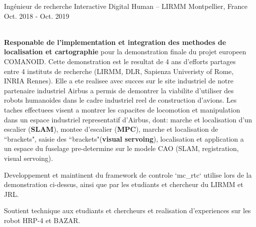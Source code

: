 \begin{cventries}
  \cventry
    {Ingénieur de recherche} %
    {Interactive Digital Human -- LIRMM} %
    {Montpellier, France} %
    {Oct. 2018 - Oct. 2019} %
    {
      \begin{cvitems} %
        \item {}\\
          \textbf{Responable de l'implementation et integration des methodes de localisation et cartographie} pour la demonstration finale du projet europeen COMANOID. Cette demonstration est le resultat de 4 ans d'efforts partages entre 4 instituts de recherche (LIRMM, DLR, Sapienza Univeristy of Rome, INRIA Rennes). Elle a ete realisee avec succes sur le site industriel de notre partenaire industriel Airbus a permis de demontrer la viabilite d'utiliser des robots humanoides dans le cadre industriel reel de construction d'avions. Les taches effectuees visent a montrer les capacites de locomotion et manipulation dans un espace industriel representatif d'Airbus, dont: marche et localisation d'un escalier (\textbf{SLAM}), montee d'escalier (\textbf{MPC}), marche et localisation de ``brackets", saisie des ``brackets"(\textbf{visual servoing}), localisation et application a un espace du fuselage pre-determine sur le modele CAO (SLAM, registration, visual servoing).
        \item Developpement et maintinent du framework de controle `mc\_rtc` utilise lors de la demonstration ci-dessus, ainsi que par les etudiants et chercheur du LIRMM et JRL.
        \item Soutient technique aux etudiants et chercheurs et realisation d'experiences sur les robot HRP-4 et BAZAR.
      \end{cvitems}
    }




\end{cventries}
